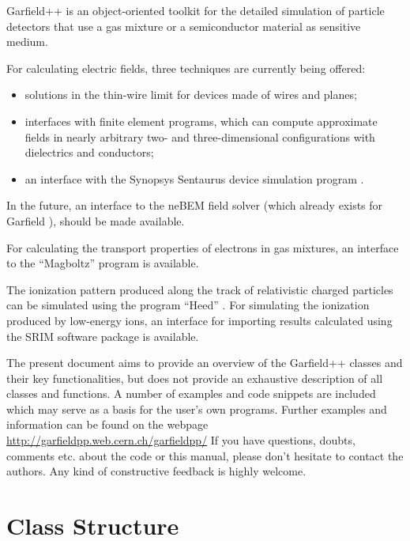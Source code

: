 Garfield++ is an object-oriented toolkit for the detailed simulation of 
particle detectors that use a gas mixture  
or a semiconductor material as sensitive medium. 

For calculating electric fields, three techniques are currently
being offered:
\begin{itemize}
  \item
  solutions in the thin-wire limit for devices made of wires and planes;
  \item
  interfaces with finite element programs, 
  which can compute approximate fields in nearly arbitrary 
  two- and three-dimensional configurations 
  with dielectrics and conductors;
  \item
  an interface with the Synopsys Sentaurus device simulation program
  \cite{Synopsys}.
\end{itemize}

In the future, an interface to the neBEM field solver 
\cite{Mukhopadhyay2007,Mukhopadhyay2006} 
(which already exists for Garfield \cite{GarfieldFortran}), 
should be made available.

For calculating the transport properties of electrons in gas 
mixtures, an interface to the ``Magboltz'' program 
\cite{BiagiMagboltz,Biagi1999} is available. 

The ionization pattern produced along the 
track of relativistic charged particles can be simulated using 
the program ``Heed'' \cite{Smirnov2005}.
For simulating the ionization produced by low-energy ions, 
an interface for importing results calculated using the 
SRIM software package \cite{Ziegler1985} 
is available.

The present document aims to provide an overview of the Garfield++ classes 
and their key functionalities, but does not provide an exhaustive 
description of all classes and functions.
A number of examples and code snippets are included 
which may serve as a basis for the user's own programs. 
Further examples and information can be found on the webpage 
\url{http://garfieldpp.web.cern.ch/garfieldpp/}
If you have questions, doubts, comments etc. about the code or this manual, 
please don't hesitate to contact the authors.
Any kind of constructive feedback is highly welcome. 
 
\section{Class Structure}

